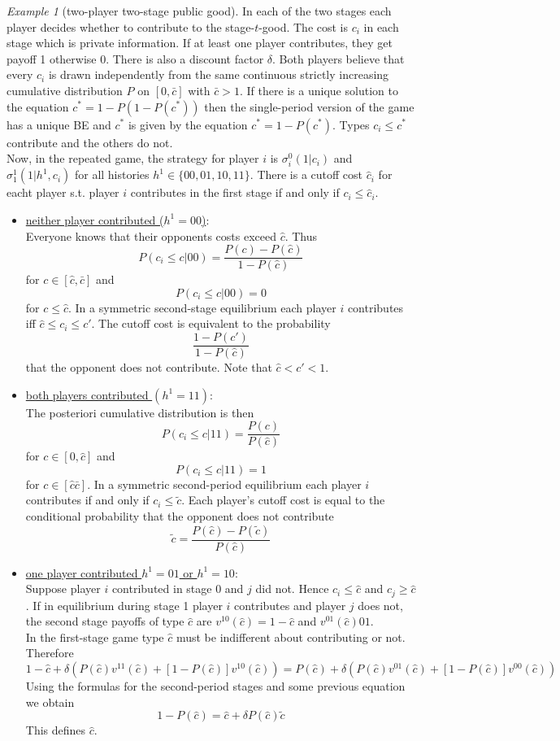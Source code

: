 \documentclass[a4paper, 12pt]{article}
\theoremstyle{plain}
\theoremstyle{definition}
\theoremstyle{lemma}
\theoremstyle{remark}
\theoremstyle{corollary}
\theoremstyle{example}
\newtheorem{example}[theorem]{Example}
\begin{document}
	\begin{example}[two-player two-stage public good]
		In each of the two stages each player decides whether to contribute to the stage-$t$-good. The cost is $c_i$ in each stage which is private information. If at least one player contributes, they get payoff 1 otherwise 0. There is also a discount factor $\delta$. Both players believe that every $c_i$ is drawn independently from the same continuous strictly increasing cumulative distribution $P$ on $[0,\bar c]$ with $\bar c > 1$. If there is a unique solution to the equation $c^* = 1-P(1-P(c^*))$ then the single-period version of the game has a unique BE and $c^*$ is given by the equation $c^* = 1-P(c^*)$. Types $c_i \leq c^*$ contribute and the others do not.\\
		Now, in the repeated game, the strategy for player $i$ is $\sigma_i^0(1|c_i)$ and $\sigma_1^1(1 | h^1,c_i)$ for all histories $h^1 \in \{00,01,10,11\}$. There is a cutoff cost $\hat c_i$ for eacht player s.t. player $i$ contributes in the first stage if and only if $c_i\leq \hat c_i$.
		\begin{itemize}
			\item \underline{neither player contributed ($h^1 = 00$)}:\\
			Everyone knows that their opponents costs exceed $\hat c$. Thus \[P(c_i \leq c | 00) = \frac{P(c) - P(\hat c)}{1-P(\hat c)}\] for $c \in [\hat c,\bar c]$ and \[P(c_i \leq c | 00) = 0\] for $c \leq \hat c$. In a symmetric second-stage equilibrium each player $i$ contributes iff $\hat c \leq c_i \leq c'$. The cutoff cost is equivalent to the probability \[\frac{1-P(c')}{1-P(\hat c)}\] that the opponent does not contribute. Note that $\hat c < c' < 1$.
			\item \underline{both players contributed $(h^1 = 11)$}:\\
			The posteriori cumulative distribution is then \[P(c_i \leq c | 11) = \frac{P(c)}{P(\hat c)}\]
			for $c \in [0,\hat c]$ and \[P(c_i \leq c | 11) = 1\]
			for $c \in [\hat c \bar c]$. In a symmetric second-period equilibrium each player $i$ contributes if and only if $c_i \leq \tilde c$. Each player's cutoff cost is equal to the conditional probability that the opponent does not contribute \[\tilde c = \frac{P(\hat c) - P(\tilde c)}{P(\hat c)}\]
			\item \underline{one player contributed $h^1 = 01$ or $h^1 = 10$}:\\
			Suppose player $i$ contributed in stage 0 and $j$ did not. Hence $c_i \leq \hat c$ and $c_j \geq \hat c$. If in equilibrium during stage 1 player $i$ contributes and player $j$ does not, the second stage payoffs of type $\hat c$ are $v^{10}(\hat c) = 1 - \hat c$ and $v^{01}(\hat c) 0 1$.\\
			In the first-stage game type $\hat c$ must be indifferent about contributing or not. Therefore \[1-\hat c + \delta(P(\hat c)v^{11}(\hat c) + [1-P(\hat c)]v^{10}(\hat c)) = P(\hat c) + \delta(P(\hat c)v^{01}(\hat c) + [1-P(\hat c)]v^{00}(\hat c))\] Using the formulas for the second-period stages and some previous equation we obtain \[1-P(\hat c) = \hat c + \delta P(\hat c)\tilde c\] This defines $\hat c$.
		\end{itemize}
	\end{example}
\end{document}
